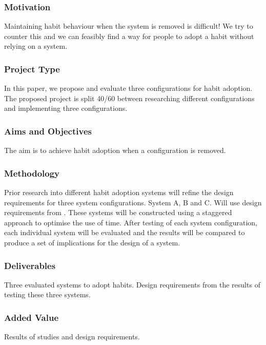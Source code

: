 \subsubsection*{Motivation}
Maintaining habit behaviour when the system is removed is difficult! We try to counter this and we can feasibly find a way for people to adopt a habit without relying on a system.


\subsubsection*{Project Type}
In this paper, we propose and evaluate three configurations for habit adoption.
The proposed project is split 40/60 between researching different configurations and implementing three configurations.


\subsubsection*{Aims and Objectives}
The aim is to achieve habit adoption when a configuration is removed.


\subsubsection*{Methodology}
Prior research into different habit adoption systems will refine the design requirements for three system configurations. System A, B and C.\newline
Will use design requirements from \cite{article_dont_forget_your_pill}.
These systems will be constructed using a staggered approach to optimise the use of time.
After testing of each system configuration, each individual system will be evaluated and the results will be compared to produce a set of implications for the design of a system.


\subsubsection*{Deliverables}
Three evaluated systems to adopt habits. Design requirements from the results of testing these three systems.


\subsubsection*{Added Value}
Results of studies and design requirements.


